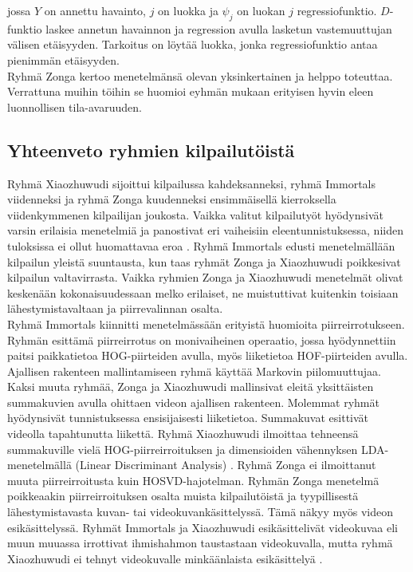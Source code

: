 jossa $Y$ on annettu havainto, $j$ on luokka ja $\psi_{j}$ on luokan $j$ regressiofunktio. $D$-funktio laskee annetun havainnon
ja regression avulla lasketun vastemuuttujan välisen etäisyyden. Tarkoitus on löytää luokka, jonka regressiofunktio antaa pienimmän etäisyyden.\\ 

Ryhmä Zonga kertoo menetelmänsä olevan yksinkertainen ja helppo toteuttaa. 
Verrattuna muihin töihin se huomioi eyhmän mukaan erityisen hyvin eleen luonnollisen tila-avaruuden. \citep{firstround} 

\subsection{Yhteenveto ryhmien kilpailutöistä}

Ryhmä Xiaozhuwudi sijoittui kilpailussa kahdeksanneksi, ryhmä Immortals viidenneksi ja ryhmä Zonga kuudenneksi ensimmäisellä kierroksella
viidenkymmenen kilpailijan joukosta. Vaikka valitut kilpailutyöt hyödynsivät varsin erilaisia menetelmiä ja panostivat eri vaiheisiin eleentunnistuksessa,
niiden tuloksissa ei ollut huomattavaa eroa \citep{6239178}. Ryhmä Immortals edusti menetelmällään kilpailun yleistä suuntausta,
kun taas ryhmät Zonga ja Xiaozhuwudi poikkesivat kilpailun valtavirrasta. Vaikka ryhmien Zonga ja Xiaozhuwudi menetelmät olivat keskenään
kokonaisuudessaan melko erilaiset, ne muistuttivat kuitenkin toisiaan lähestymistavaltaan ja piirrevalinnan osalta.\\

Ryhmä Immortals kiinnitti menetelmässään erityistä huomioita piirreirrotukseen. Ryhmän esittämä piirreirrotus on monivaiheinen operaatio,
jossa hyödynnettiin paitsi paikkatietoa HOG-piirteiden avulla, myös liiketietoa HOF-piirteiden avulla.
Ajallisen rakenteen mallintamiseen ryhmä käyttää Markovin piilomuuttujaa. Kaksi muuta ryhmää,
Zonga ja Xiaozhuwudi mallinsivat eleitä yksittäisten summakuvien avulla ohittaen videon ajallisen rakenteen.
Molemmat ryhmät hyödynsivät tunnistuksessa ensisijaisesti liiketietoa. Summakuvat esittivät videolla tapahtunutta liikettä.
Ryhmä Xiaozhuwudi ilmoittaa tehneensä summakuville vielä HOG-piirreirroituksen ja dimensioiden vähennyksen LDA-menetelmällä (Linear Discriminant Analysis) \citep{6239179}.
Ryhmä Zonga ei ilmoittanut muuta piirreirroitusta kuin HOSVD-hajotelman. Ryhmän Zonga menetelmä poikkeaakin piirreirroituksen osalta
muista kilpailutöistä ja tyypillisestä lähestymistavasta kuvan- tai videokuvankäsittelyssä. Tämä näkyy myös videon esikäsittelyssä. 
Ryhmät Immortals ja Xiaozhuwudi esikäsittelivät videokuvaa eli muun muuassa irrottivat ihmishahmon taustastaan videokuvalla,
mutta ryhmä Xiaozhuwudi ei tehnyt videokuvalle minkäänlaista esikäsittelyä \citep{firstround}.\\


